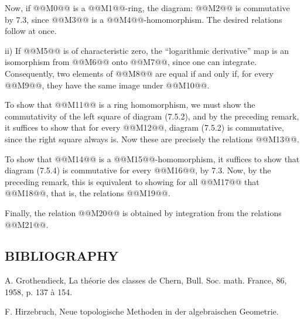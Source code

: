 Now, if @@M0@@ is a @@M1@@-ring, the diagram:
@@M2@@
is commutative by 7.3, since @@M3@@ is a @@M4@@-homomorphism. The desired relations follow at once.

ii) If @@M5@@ is of characteristic zero, the ``logarithmic derivative'' map is an isomorphism from @@M6@@ onto @@M7@@, since one can integrate. Consequently, two elements of @@M8@@ are equal if and only if, for every @@M9@@, they have the same image under @@M10@@.

To show that @@M11@@ is a ring homomorphism, we must show the commutativity of the left square of diagram (7.5.2), and by the preceding remark, it suffices to show that for every @@M12@@, diagram (7.5.2) is commutative, since the right square always is. Now these are precisely the relations @@M13@@.

To show that @@M14@@ is a @@M15@@-homomorphism, it suffices to show that diagram (7.5.4) is commutative for every @@M16@@, by 7.3. Now, by the preceding remark, this is equivalent to showing for all @@M17@@ that @@M18@@, that is, the relations @@M19@@.

Finally, the relation @@M20@@ is obtained by integration from the relations @@M21@@.

\subsection*{BIBLIOGRAPHY}
\begin{enumerate}[label={[\arabic*]}]
\item A. Grothendieck, La théorie des classes de Chern, Bull. Soc. math. France, 86, 1958, p. 137 à 154.
\item F. Hirzebruch, Neue topologische Methoden in der algebraischen Geometrie.
\end{enumerate}

\providecommand{\Sym}{\operatorname{Sym}}
\providecommand{\Proj}{\operatorname{Proj}}
\providecommand{\Projz}{\operatorname{Proj}_0}
\providecommand{\Spec}{\operatorname{Spec}}
\providecommand{\Comp}{\operatorname{Comp}}
\providecommand{\Dplus}{D_{+}}
\providecommand{\id}{\operatorname{id}}
\providecommand{\cG}{\mathcal G}
\providecommand{\cA}{\mathcal A}
\providecommand{\cB}{\mathcal B}
\providecommand{\cL}{\mathscr L}
\providecommand{\cM}{\mathscr M}
\providecommand{\cN}{\mathscr N}
\providecommand{\cE}{\mathscr E}
\providecommand{\cK}{\mathscr K}
\providecommand{\cP}{\mathscr P}
\providecommand{\cQ}{\mathscr Q}
\providecommand{\OO}{\mathcal O}
\providecommand{\rk}{\operatorname{rk}}
\providecommand{\colim}{\operatorname*{colim}}

